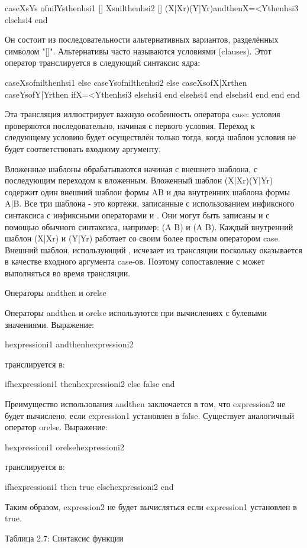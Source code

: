 caseXsYs
ofnilYsthenhsi1
[] Xsnilthenhsi2
[] (X|Xr)(Y|Yr)andthenX=<Ythenhsi3
elsehsi4 end

Он состоит из последовательности альтернативных вариантов, разделённых символом "[]". Альтернативы часто называются условиями (clauses). Этот оператор транслируется в следующий синтаксис ядра:

caseXsofnilthenhsi1
else
caseYsofnilthenhsi2
else
caseXsofX|Xrthen
caseYsofY|Yrthen
ifX=<Ythenhsi3 elsehsi4 end
elsehsi4 end
elsehsi4 end
end
end

Эта трансляция иллюстрирует важную особенность оператора case: условия проверяются последовательно, начиная с первого условия. Переход к следующему условию будет осуществлён только тогда, когда шаблон условия не будет соответствовать входному аргументу.

Вложенные шаблоны обрабатываются начиная с внешнего шаблона, с последующим переходом к вложенным. Вложенный шаблон (X|Xr)(Y|Yr) содержит один внешний шаблон формы AB и два внутренних шаблона формы A|B. Все три шаблона - это кортежи, записанные с использованием инфиксного синтаксиса с инфиксными операторами  и . Они могут быть записаны и с помощью обычного синтаксиса, например: (A B) и (A B). Каждый внутренний шаблон  (X|Xr) и (Y|Yr) работает со своим более простым оператором case. Внешний шаблон, использующий , исчезает из трансляции поскольку оказывается в качестве входного аргумента case-ов. Поэтому сопоставление с  может выполняться во время трансляции.

Операторы andthen и orelse

Операторы andthen и orelse используются при вычислениях с булевыми значениями. Выражение:

hexpressioni1 andthenhexpressioni2

транслируется в:

ifhexpressioni1 thenhexpressioni2 else false end

Преимущество использования andthen заключается в том, что expression2 не будет вычислено, если expression1 установлен в false. Существует аналогичный оператор orelse. Выражение:

hexpressioni1 orelsehexpressioni2

транслируется в:

ifhexpressioni1 then true elsehexpressioni2 end

Таким образом, expression2 не будет вычисляться если expression1 установлен в true.

Таблица 2.7: Синтаксис функции


